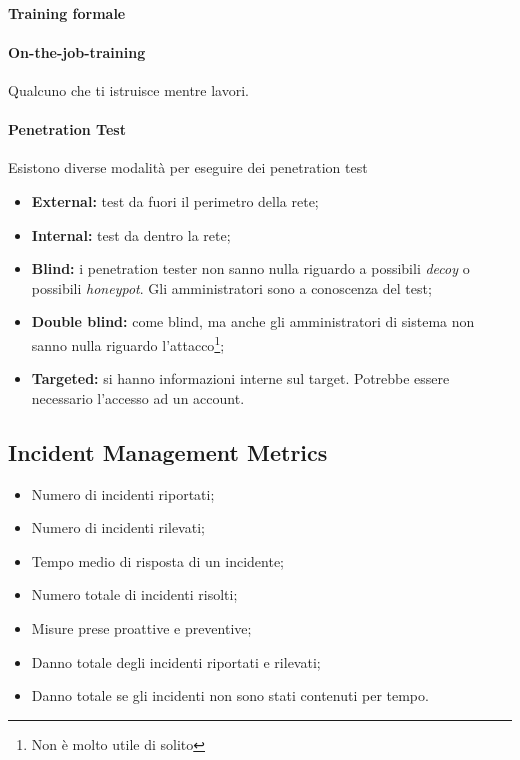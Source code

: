 \paragraph*{Training formale}

\paragraph*{On-the-job-training} Qualcuno che ti istruisce mentre lavori.


\paragraph*{Penetration Test} Esistono diverse modalità per eseguire dei
penetration test
\begin{itemize}
\item \textbf{External:} test da fuori il perimetro della rete;
\item \textbf{Internal:} test da dentro la rete;
\item \textbf{Blind:} i penetration tester non sanno nulla riguardo a possibili
\textit{decoy} o possibili \textit{honeypot}. Gli amministratori sono a
conoscenza del test;
\item \textbf{Double blind:} come blind, ma anche gli amministratori di sistema non sanno
nulla riguardo l'attacco\footnote{Non è molto utile di solito};
\item \textbf{Targeted:} si hanno informazioni interne sul target. Potrebbe essere
necessario l'accesso ad un account.
\end{itemize}

\subsection{Incident Management Metrics}

\begin{itemize}
\item Numero di incidenti riportati;
\item Numero di incidenti rilevati;
\item Tempo medio di risposta di un incidente;
\item Numero totale di incidenti risolti;
\item Misure prese proattive e preventive;
\item Danno totale degli incidenti riportati e rilevati;
\item Danno totale se gli incidenti non sono stati contenuti per tempo.
\end{itemize}

